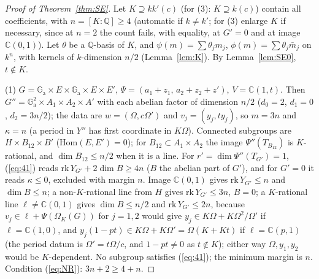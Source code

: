 \documentclass[11pt]{amsart}
\theoremstyle{definition}
\newcommand{\C}{\mathbb{C}}
\newcommand{\Q}{\mathbb{Q}}
\newcommand{\Ga}{\mathbb{G}_{\mathrm a}}
\begin{document}
\begin{proof}[Proof of Theorem~\ref{thm:SE}]
Let $K\supseteq kk'(c)$ (for (3): $K\supseteq k(c)$) contain all coefficients, with $n=[K:\Q]\ge4$ (automatic if $k\ne k'$;
for (3) enlarge $K$ if necessary, since at $n=2$ the count fails, with equality, at $G'=0$ and at image $\C(0,1)$). Let
$\theta$ be a $\Q$-basis of $K$, and $\psi(m)=\sum\theta_jm_j$, $\phi(m)=\sum\theta_j\bar m_j$ on $k^n$, with kernels of
$k$-dimension $n/2$ (Lemma~\ref{lem:K}). By Lemma~\ref{lem:SE0}, $t\notin K$.

(1) $G=\Ga\times E\times\Ga\times E\times E'$, $\Psi=(a_1+z_1,\,a_2+z_2+z')$, $V=\C(1,t)$. Then
$G''=\Ga^2\times A_1\times A_2\times A'$ with each abelian factor of dimension $n/2$ ($d_0=2$, $d_1=0$, $d_2=3n/2$); the
data are $w=(\Omega,c\Omega')$ and $v_j=(y_j,ty_j)$, so $m=3n$ and $\kappa=n$ (a period in $Y''$ has first coordinate in
$K\Omega$). Connected subgroups are $H\times B_{12}\times B'$ ($\mathrm{Hom}(E,E')=0$); for $B_{12}\subset A_1\times A_2$ the image
$\Psi''(T_{B_{12}})$ is $K$-rational, and $\dim B_{12}\le n/2$ when it is a line. For $r'=\dim\Psi''(T_{G'})=1$,
(\ref{eq:41}) reads $\mathrm{rk}\,Y_{G'}+2\dim B\ge4n$ ($B$ the abelian part of $G'$), and for $G'=0$ it reads
$\kappa\le0$, excluded with margin $n$. Image $\C(0,1)$ gives $\mathrm{rk}\,Y_{G'}\le n$ and $\dim B\le n$; a non-$K$-rational
line from $H$ gives $\mathrm{rk}\,Y_{G'}\le3n$, $B=0$; a $K$-rational line $\ell\neq\C(0,1)$ gives $\dim B\le n/2$ and
$\mathrm{rk}\,Y_{G'}\le2n$, because $v_j\in\ell+\Psi(\Omega_K(G))$ for $j=1,2$ would give $y_j\in K\Omega+K\Omega^2/\Omega'$ if
$\ell=\C(1,0)$, and $y_j(1-pt)\in K\Omega+K\Omega'=\Omega(K+Kt)$ if $\ell=\C(p,1)$ (the period datum is $\Omega'=t\Omega/c$,
and $1-pt\neq0$ as $t\notin K$); either way $\Omega,y_1,y_2$ would be $K$-dependent. No subgroup satisfies
(\ref{eq:41}); the minimum margin is $n$. Condition (\ref{eq:NR}): $3n+2\ge4+n$.


\end{proof}
\end{document}
